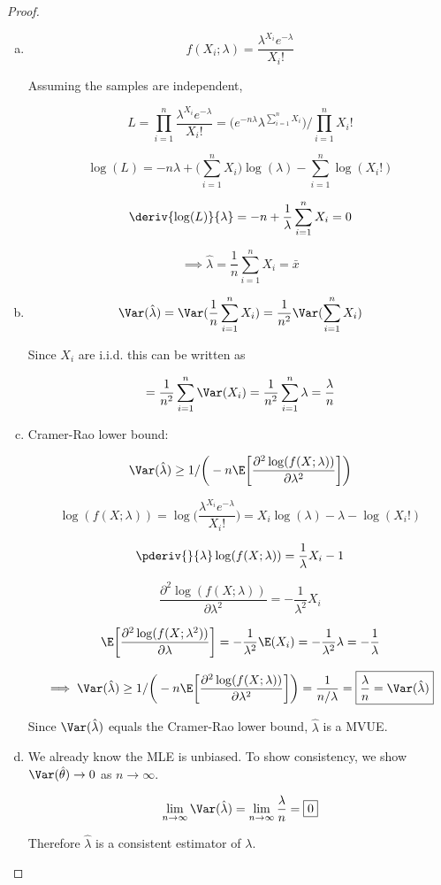\begin{proof}

\begin{enumerate}[(a)]

\item

\[
f(X_i; \lambda) = \frac{\lambda^{X_i} e^{-\lambda}}{X_i!}
\]

Assuming the samples are independent,

\[
L = \prod_{i=1}^n \frac{\lambda^{X_i} e^{-\lambda}}{X_i!} = \bigg(e^{-n\lambda}\lambda^{\sum_{i=1}^n X_i}\bigg)/ \prod_{i=1}^n X_i!
\]

\[
\log(L) = -n \lambda + \bigg( \sum_{i=1}^n X_i \bigg) \log(\lambda) - \sum_{i=1}^n \log(X_i!)
\]

\[
\deriv{\log(L)}{\lambda} = -n + \frac{1}{\lambda} \sum_{i=1}^n X_i  = 0
\]

\[
\implies 
\hat{\lambda} = \frac{1}{n} \sum_{i=1}^n X_i = \bar{x}
\]

\item 

\[
\Var(\hat{\lambda}) = \Var(\frac{1}{n} \sum_{i=1}^n X_i) = \frac{1}{n^2} \Var(\sum_{i=1}^n X_i)
\]

Since \(X_i\) are i.i.d. this can be written as

\[
= \frac{1}{n^2} \sum_{i=1}^n \Var(X_i) = \frac{1}{n^2} \sum_{i=1}^n  \lambda = \frac{\lambda}{n}
\]

\item Cramer-Rao lower bound:

\[
\Var(\hat{\lambda}) \geq 1/\bigg(-n \E \bigg[ \frac{\partial^2 \log(f(X; \lambda))}{\partial \lambda^2} \bigg] \bigg)
\]

\[
\log(f(X; \lambda)) = \log\bigg( \frac{\lambda^{X_i} e^{-\lambda}}{X_i!} \bigg) =   X_i \log(\lambda) -  \lambda -  \log(X_i!)
\]

\[
\pderiv{}{\lambda} \log(f(X; \lambda)) = \frac{1}{\lambda} X_i - 1
\]

\[
 \frac{\partial^2 \log(f(X; \lambda))}{\partial \lambda^2} = -\frac{1}{\lambda^2}  X_i 
\]

\[
\E \bigg[  \frac{\partial^2 \log(f(X; \lambda^2))}{\partial \lambda}  \bigg] = -\frac{1}{\lambda^2} \E ( X_i ) = -\frac{1}{\lambda^2} \lambda = -\frac{1}{\lambda} 
\]

\[
\implies \Var(\hat{\lambda}) \geq 1/\bigg(-n \E \bigg[ \frac{\partial^2 \log(f(X; \lambda))}{\partial \lambda^2} \bigg] \bigg) = \frac{1}{n/\lambda} = \boxed{\frac{\lambda}{n} = \Var(\hat{\lambda})}
\]

Since \(\Var(\hat{\lambda})\) equals the Cramer-Rao lower bound, \(\hat{\lambda}\) is a MVUE.

\item We already know the MLE is unbiased. To show consistency, we show \(\Var(\hat{\theta}) \to 0\)  as \( n \to \infty\).

\[
\lim_{n \to \infty} \Var(\hat{\lambda})  = \lim_{n \to \infty} \frac{\lambda}{n} = \boxed{0}
\]

Therefore \(\hat{\lambda}\) is a consistent estimator of \(\lambda\).

\end{enumerate}
\end{proof}

